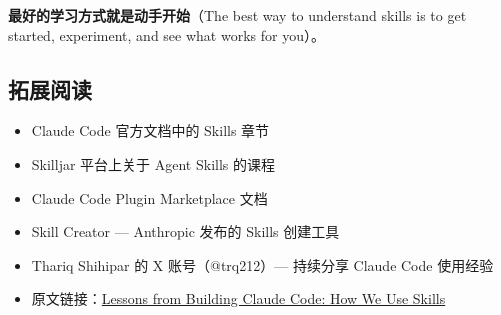 \textbf{最好的学习方式就是动手开始}（The best way to understand skills is to get started, experiment, and see what works for you）。

\subsection{拓展阅读}

\begin{itemize}
    \item Claude Code 官方文档中的 Skills 章节
    \item Skilljar 平台上关于 Agent Skills 的课程
    \item Claude Code Plugin Marketplace 文档
    \item Skill Creator --- Anthropic 发布的 Skills 创建工具
    \item Thariq Shihipar 的 X 账号（@trq212）--- 持续分享 Claude Code 使用经验
    \item 原文链接：\href{https://x.com/trq212/status/2033949937936085378}{Lessons from Building Claude Code: How We Use Skills}
\end{itemize}



